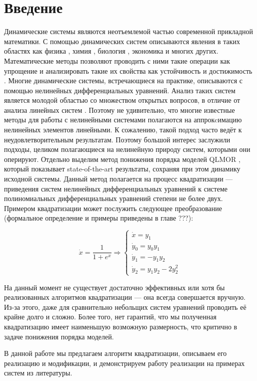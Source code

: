 
\section{Введение}

Динамические системы являются неотъемлемой частью современной прикладной математики. С помощью динамических систем описываются явления в таких областях как физика \cite{physics-example}, химия \cite{chemistry-example}, биология \cite{biology-example}, экономика \cite{economics-example} и многих других. Математические методы позволяют проводить с ними такие операции как упрощение \cite{MOR-book} и анализировать такие их свойства как устойчивость \cite{Strogatz-book} и достижимость \cite{Scott-reachability}. Многие динамические системы, встречающиеся на практике, описываются с помощью нелинейных дифференциальных уравнений. Анализ таких  систем является молодой областью со множеством открытых вопросов, в отличие от анализа линейных систем \cite{MOR-linear-overview}. Поэтому не удивительно, что многие известные методы для работы с нелинейными системами полагаются на аппрокcимацию нелинейных элементов линейными. К сожалению, такой подход часто ведёт к неудовлетворительным результатам. 
Поэтому большой интерес заслужили подходы, целиком полагающиеся на нелинейную природу систем, которыми они оперируют. 
Отдельно выделим метод понижения порядка моделей QLMOR \cite{Gu-PhD, Kramer-Willcox}, который показывает state-of-the-art результаты, сохраняя при этом динамику исходной системы. 
Данный метод полагается на процесс квадратизации --- приведения систем нелинейных дифференциальных уравнений к системе полиномиальных дифференциальных уравнений степени не более двух. 
Примером квадратизации может послужить следующее преобразование {\color{red}(формальное определение и примеры приведены в главе ???)}:

\[
     \dot x = \frac{1}{1 + e^x} 
\Longrightarrow
\begin{cases}
    \dot x = y_1 \\
    \dot y_0 = y_0 y_1 \\
    \dot y_1 = -y_1 y_2 \\
    \dot y_2 = y_1 y_2 - 2y_2^2
\end{cases}
\]

На данный момент не существует достаточно эффективных или хотя бы реализованных алгоритмов квадратизации --- она всегда совершается вручную.
Из-за этого, даже для сравнительно небольщих систем уравнений проводить её крайне долго и сложно. 
Более того, нет гарантий, что мы полученная квадратизацию имеет наименьшую возможную размерность, что критично в задаче понижения порядка моделей. 

В данной работе мы предлагаем алгоритм квадратизации, описываем его реализацию и модификации, и демонстрируем работу реализации на примерах систем из литературы.